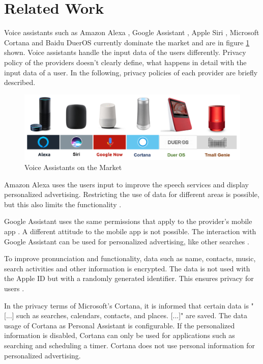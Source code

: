 \section{Related Work}
Voice assistants such as Amazon Alexa \cite{alexaAssitant}, Google Assistant \cite{googleAssistant}, Apple Siri \cite{siriAssistant}, Microsoft Cortana \cite{cortanaAssistant} and Baidu DuerOS \cite{baiduAssistant} currently dominate the market and are in figure \ref{fig:sprachassistenten} shown. Voice assistants handle the input data of the users differently. Privacy policy of the providers doesn't clearly define, what happens in detail with the input data of a user. In the following, privacy policies of each provider are briefly described.

\begin{figure}[h!]
	\centering
	\includegraphics[width=1\linewidth]{Picture/Sprachassistenten}
	\caption[Voice Assistants on the Market\cite{homeVoiceAssistants}]{Voice Assistants on the Market\cite{homeVoiceAssistants}}
	\label{fig:sprachassistenten}
\end{figure}

Amazon Alexa uses the users input to improve the speech services and display personalized advertising. Restricting the use of data for different areas is possible, but this also limits the functionality \cite{alexaPrivacy}.

Google Assistant uses the same permissions that apply to the provider's mobile app \cite{googleShare}. A different attitude to the mobile app is not possible. The interaction with Google Assistant can be used for personalized advertising, like other searches \cite{googlePrivacy}.

To improve pronunciation and functionality, data such as name, contacts, music, search activities and other information is encrypted. The data is not used with the Apple ID but with a randomly generated identifier. This ensures privacy for users \cite{siriPrivacy}.

In the privacy terms of Microsoft's Cortana, it is informed that certain data is "[...] such as searches, calendars, contacts, and places. [...]"\cite{cortanaAssistant} are saved. The data usage of Cortana as Personal Assistant is configurable. If the personalized information is disabled, Cortana can only be used for applications such as searching and scheduling a timer. Cortana does not use personal information for personalized advertising.

